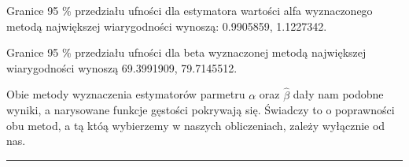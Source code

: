 \documentclass[
]{article}
\begin{document}
Granice 95 \% przedziału ufności dla estymatora wartości alfa
wyznaczonego metodą największej wiarygodności wynoszą: 0.9905859,
1.1227342.

Granice 95 \% przedziału ufności dla beta wyznaczonej metodą największej
wiarygodności wynoszą 69.3991909, 79.7145512.

Obie metody wyznaczenia estymatorów parmetru \(\alpha\) oraz
\(\hat{\beta}\) dały nam podobne wyniki, a narysowane funkcje gęstości
pokrywają się. Świadczy to o poprawności obu metod, a tą któą wybierzemy
w naszych obliczeniach, zależy wyłącznie od nas.

\begin{center}\rule{0.5\linewidth}{0.5pt}\end{center}
\end{document}
